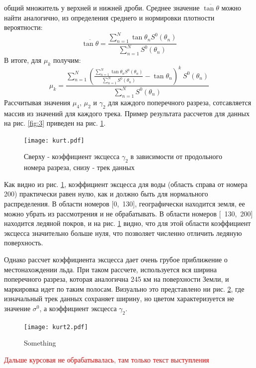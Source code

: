 общий множитель у верхней и нижней дроби. Среднее значение $\overline{\tan\theta}$ можно найти аналогично, из
определения среднего и нормировки плотности вероятности:
\begin{equation}
  \overline{\tan\theta} = \frac{\sum \limits_{n = 1}^{N} \tan \theta_n S^0(\theta_n) }{\sum \limits_{n = 1}^{N} S^0(\theta_n)}
  \label{eq:18}
\end{equation}
В итоге, для $\mu_k$ получим:
\begin{equation}
  \mu_k = \frac{\sum \limits_{n = 1}^{N} (\frac{\sum \limits_{n = 1}^{N} \tan \theta_n S^0(\theta_n) }{\sum \limits_{n = 1}^{N} S^0(\theta_n)} - \tan \theta_n)^k~ S^0(\theta_n)}{\sum \limits_{n = 1}^{N} S^0(\theta_n) }
  \label{eq:19}
\end{equation}
Рассчитывая значения $\mu_4$, $\mu_2$ и $\gamma_2$ для каждого поперечного разреза, сотсавляется массив из значений для
каждого трека. Пример результата рассчетов для данных на рис. \ref{fig:3} приведен на рис. \ref{fig:6}.
\begin{figure}[h!]
  \centering
    \texttt{[image: kurt.pdf]}
  \caption{Сверху - коэффициент эксцесса $\gamma_2$ в зависимости от продольного номера разреза, снизу - трек данных}
  \label{fig:6}
\end{figure}

Как видно из рис. \ref{fig:6}, коэффициент эксцесса для воды (область справа от номера 200) практически равен нулю, как
и должно быть для нормального распределения. В области номеров [0,~130], географически находится
земля, ее можно убрать из рассмотрения и не обрабатывать. В области номеров [~130,~200] находится ледяной покров, и на  рис. \ref{fig:6}
видно, что для этой области коэффициент эксцесса значительно больше нуля, что позволяет численно отличить ледяную поверхность.

Однако рассчет коэффициента эксцесса дает очень грубое приближение о местонахождении льда. При таком рассчете,
используется вся ширина поперечного разреза, которая аналогична 245 км на поверхности Земли, и маркировка идет по
таким полосам. Визуально это представлено ни рис. \ref{fig:7}, где изначальный трек данных сохраняет ширину, но цветом
характеризуется не значение $\sigma^0$, а коэффициент эксцесса $\gamma_2$.

\begin{figure}[h!]
  \centering
  \texttt{[image: kurt2.pdf]}
  \caption{Something}
  \label{fig:7}
\end{figure}

\textcolor{red}{Дальше курсовая не обрабатывалась, там только текст выступления}
